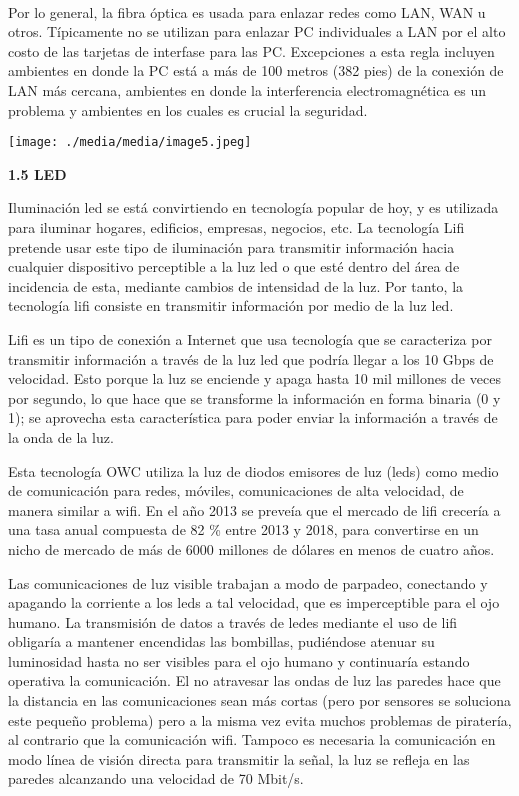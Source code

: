 ~

Por lo general, la fibra óptica es usada para enlazar redes como LAN,
WAN u otros. Típicamente no se utilizan para enlazar PC individuales a
LAN por el alto costo de las tarjetas de interfase para las PC.
Excepciones a esta regla incluyen ambientes en donde la PC está a más de
100 metros (382 pies) de la conexión de LAN más cercana, ambientes en
donde la interferencia electromagnética es un problema y ambientes en
los cuales es crucial la seguridad.

\texttt{[image: ./media/media/image5.jpeg]}

\textbf{1.5 LED}

Iluminación led se está convirtiendo en tecnología popular de hoy, y es
utilizada para iluminar hogares, edificios, empresas, negocios, etc. La
tecnología Lifi pretende usar este tipo de iluminación para transmitir
información hacia cualquier dispositivo perceptible a la luz led o que
esté dentro del área de incidencia de esta, mediante cambios de
intensidad de la luz. Por tanto, la tecnología lifi consiste en
transmitir información por medio de la luz led.

Lifi es un tipo de conexión a Internet que usa tecnología que se
caracteriza por transmitir información a través de la luz led que podría
llegar a los 10 Gbps de velocidad. Esto porque la luz se enciende y
apaga hasta 10 mil millones de veces por segundo, lo que hace que se
transforme la información en forma binaria (0 y 1); se aprovecha esta
característica para poder enviar la información a través de la onda de
la luz.

Esta tecnología OWC utiliza la luz de diodos emisores de luz (leds) como
medio de comunicación para redes, móviles, comunicaciones de alta
velocidad, de manera similar a wifi. En el año 2013 se preveía que el
mercado de lifi crecería a una tasa anual compuesta de 82 \% entre 2013
y 2018, para convertirse en un nicho de mercado de más de 6000 millones
de dólares en menos de cuatro años.

Las comunicaciones de luz visible trabajan a modo de parpadeo,
conectando y apagando la corriente a los leds a tal velocidad, que es
imperceptible para el ojo humano. La transmisión de datos a través de
ledes mediante el uso de lifi obligaría a mantener encendidas las
bombillas, pudiéndose atenuar su luminosidad hasta no ser visibles para
el ojo humano y continuaría estando operativa la comunicación. El no
atravesar las ondas de luz las paredes hace que la distancia en las
comunicaciones sean más cortas (pero por sensores se soluciona este
pequeño problema) pero a la misma vez evita muchos problemas de
piratería, al contrario que la comunicación wifi. Tampoco es necesaria
la comunicación en modo línea de visión directa para transmitir la
señal, la luz se refleja en las paredes alcanzando una velocidad de 70
Mbit/s.

